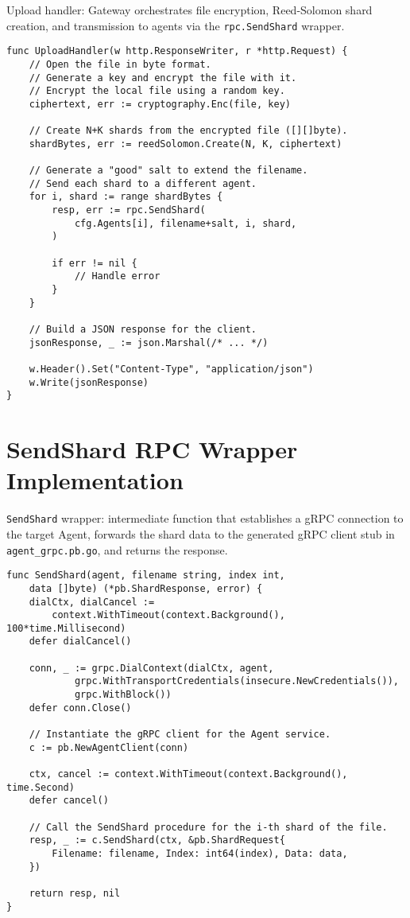 \begin{listing}[H]
\caption{Upload handler: Gateway orchestrates file encryption, Reed-Solomon shard creation, and transmission to agents via the \texttt{rpc.SendShard} wrapper.}
\begin{verbatim}
func UploadHandler(w http.ResponseWriter, r *http.Request) {
    // Open the file in byte format.
    // Generate a key and encrypt the file with it.
    // Encrypt the local file using a random key.
    ciphertext, err := cryptography.Enc(file, key)
    
    // Create N+K shards from the encrypted file ([][]byte).
    shardBytes, err := reedSolomon.Create(N, K, ciphertext)

    // Generate a "good" salt to extend the filename.
    // Send each shard to a different agent.
    for i, shard := range shardBytes {
        resp, err := rpc.SendShard(
            cfg.Agents[i], filename+salt, i, shard,
        )

        if err != nil {
            // Handle error
        }
    }
    
    // Build a JSON response for the client.
    jsonResponse, _ := json.Marshal(/* ... */)

    w.Header().Set("Content-Type", "application/json")
    w.Write(jsonResponse)
}

\end{verbatim}
\end{listing}

\section{SendShard RPC Wrapper Implementation} \label{code:rpc-send-shard}

\begin{listing}[H]
\caption{\texttt{SendShard} wrapper: intermediate function that establishes a gRPC connection to the target Agent, forwards the shard data to the generated gRPC client stub in \texttt{agent\_grpc.pb.go}, and returns the response.}
\begin{verbatim}
func SendShard(agent, filename string, index int, 
    data []byte) (*pb.ShardResponse, error) {
    dialCtx, dialCancel := 
        context.WithTimeout(context.Background(), 100*time.Millisecond)
	defer dialCancel()

    conn, _ := grpc.DialContext(dialCtx, agent,
            grpc.WithTransportCredentials(insecure.NewCredentials()),
            grpc.WithBlock())
    defer conn.Close()

    // Instantiate the gRPC client for the Agent service.
    c := pb.NewAgentClient(conn) 

    ctx, cancel := context.WithTimeout(context.Background(), time.Second)
    defer cancel()

    // Call the SendShard procedure for the i-th shard of the file.
    resp, _ := c.SendShard(ctx, &pb.ShardRequest{
        Filename: filename, Index: int64(index), Data: data,
    })

    return resp, nil
}
\end{verbatim}
\end{listing}


